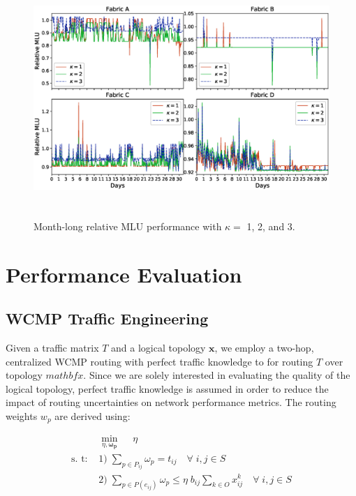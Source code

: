 \documentclass[sigconf]{acmart}
\theoremstyle{definition}
\begin{document}
\begin{figure}[t!]
\centering
\includegraphics[scale=1.2, width=\textwidth, height=9cm, trim={2.5cm 1.9cm 1cm 0.85cm}]{figures/mlu.eps}
\caption{Month-long relative MLU performance with $\kappa = $ 1, 2, and 3.}
\label{mlu_results}
\end{figure}

\section{Performance Evaluation}\label{section_timeseries_analysis}

\subsection{WCMP Traffic Engineering}   
Given a traffic matrix $T$ and a logical topology $\mathbf{x}$, we employ a two-hop, centralized WCMP \cite{zhou2014wcmp} routing with perfect traffic knowledge to for routing $T$ over topology $mathbf{x}$. Since we are solely interested in evaluating the quality of the logical topology, perfect traffic knowledge is assumed in order to reduce the impact of routing uncertainties on network performance metrics. The routing weights $w_p$ are derived using:

\begin{equation}\label{wcmp_routing}
\begin{aligned}
&\min\limits_{\eta, \boldsymbol{\omega_p}} \; \quad \eta \\
\text{s. t: } & 1) \; \sum_{p \in P_{ij}} \omega_{p} = t_{ij} \quad \forall \; i, j \in S\\
& 2) \; \sum_{p \in P(e_{ij})} \omega_p \leq \eta \; b_{ij} \sum_{k \in O}x_{ij}^k \quad \forall \; i, j \in S \\
\end{aligned}
\end{equation}
\end{document}
